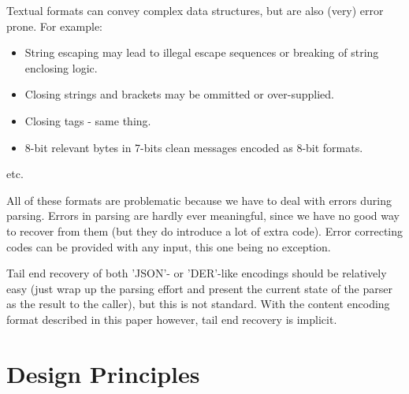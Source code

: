 Textual formats can convey complex data structures, but are also
(very) error prone. For example:

\begin{itemize}
\item String escaping may lead to illegal escape sequences or breaking
  of string enclosing logic.
\item Closing strings and brackets may be ommitted or over-supplied.
\item Closing tags - same thing.
\item 8-bit relevant bytes in 7-bits clean messages encoded as 8-bit formats.
\end{itemize}
etc.

All of these formats are problematic because we have to deal with
errors during parsing. Errors in parsing are hardly ever meaningful,
since we have no good way to recover from them (but they do introduce
a lot of extra code). Error correcting codes can be provided with any input,
this one being no exception.

Tail end recovery of both 'JSON'- or 'DER'-like encodings should be
relatively easy (just wrap up the parsing effort and present the current
state of the parser as the result to the caller), but this is not standard.
With the content encoding format described in this paper however, tail end recovery is implicit.

\section{Design Principles}
 
